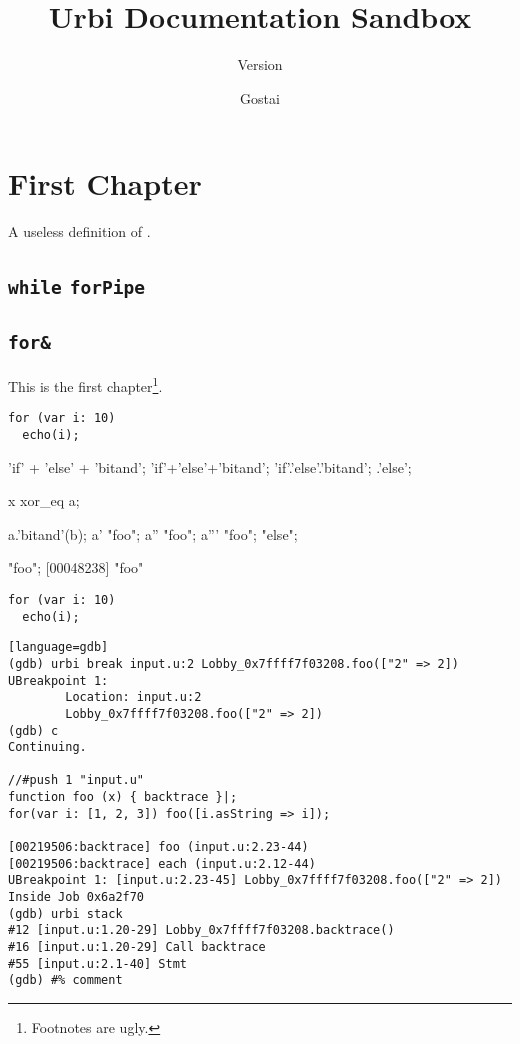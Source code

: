 \documentclass[openright,twoside,11pt]{book}
\title{Urbi Documentation Sandbox}
\subtitle{Version \VcsDescription}
\author{Gostai}
\begin{document}
\maketitle
\tableofcontents
\chapter{First Chapter}

A useless definition of .

\section{\lstinline{while} \lstinline{forPipe}}
\section{\texorpdfstring{\lstinline{for&}}{for\&}}

This is the first chapter\footnote{Footnotes are ugly.}.


\begin{verbatim}
for (var i: 10)
  echo(i);
\end{verbatim}

\begin{urbiunchecked}
'if' + 'else' + 'bitand';
'if'+'else'+'bitand';
'if'.'else'.'bitand';
.'else';

x xor_eq a;

a.'bitand'(b);
a' "foo";
a'' "foo";
a''' "foo";
"else";

"foo";
[00048238] "foo"
\end{urbiunchecked}


\begin{verbatim}
for (var i: 10)
  echo(i);
\end{verbatim}

\begin{verbatim}[language=gdb]
(gdb) urbi break input.u:2 Lobby_0x7ffff7f03208.foo(["2" => 2])
UBreakpoint 1:
        Location: input.u:2
        Lobby_0x7ffff7f03208.foo(["2" => 2])
(gdb) c
Continuing.

//#push 1 "input.u"
function foo (x) { backtrace }|;
for(var i: [1, 2, 3]) foo([i.asString => i]);

[00219506:backtrace] foo (input.u:2.23-44)
[00219506:backtrace] each (input.u:2.12-44)
UBreakpoint 1: [input.u:2.23-45] Lobby_0x7ffff7f03208.foo(["2" => 2])
Inside Job 0x6a2f70
(gdb) urbi stack
#12 [input.u:1.20-29] Lobby_0x7ffff7f03208.backtrace()
#16 [input.u:1.20-29] Call backtrace
#55 [input.u:2.1-40] Stmt
(gdb) #% comment
\end{verbatim}
\end{document}
